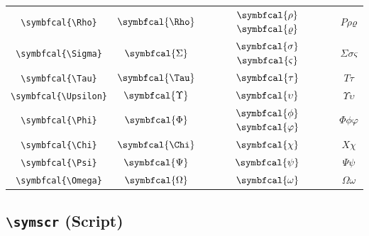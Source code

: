 \documentclass[12pt,a4paper]{article}
\begin{document}
\begin{longtable}{|c|c|c|c|}
\verb|\symbfcal{\Rho}| & $\symbfcal{\Rho}$ & $\symbfcal{\rho}$ $\symbfcal{\varrho}$ & $ Ρ 𝜌 𝜚 $ \\
\verb|\symbfcal{\Sigma}| & $\symbfcal{\Sigma}$ & $\symbfcal{\sigma}$ $\symbfcal{\varsigma}$ & $ Σ 𝜎 𝜍 $ \\
\verb|\symbfcal{\Tau}| & $\symbfcal{\Tau}$ & $\symbfcal{\tau}$ & $ Τ 𝜏 $ \\
\verb|\symbfcal{\Upsilon}| & $\symbfcal{\Upsilon}$ & $\symbfcal{\upsilon}$ & $ Υ 𝜐 $ \\
\verb|\symbfcal{\Phi}| & $\symbfcal{\Phi}$ & $\symbfcal{\phi}$ $\symbfcal{\varphi}$ & $ Φ 𝜙 𝜑 $ \\
\verb|\symbfcal{\Chi}| & $\symbfcal{\Chi}$ & $\symbfcal{\chi}$ & $ Χ 𝜒 $ \\
\verb|\symbfcal{\Psi}| & $\symbfcal{\Psi}$ & $\symbfcal{\psi}$ & $ Ψ 𝜓 $ \\
\verb|\symbfcal{\Omega}| & $\symbfcal{\Omega}$ & $\symbfcal{\omega}$ & $ Ω 𝜔 $ \\
\hline
\end{longtable}

\newpage

\subsection*{\texttt{\textbackslash{}symscr} (Script)}
\end{document}
